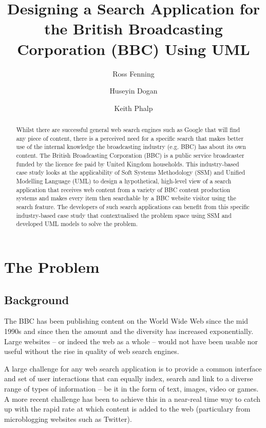 \documentclass{llncs}
\title{Designing a Search Application for the British Broadcasting Corporation (BBC) Using UML}
\author{Ross Fenning\inst{1}
  \and Huseyin Dogan\inst{2}
  \and Keith Phalp\inst{2}}
\institute{BBC, UK \email{Ross.Fenning@bbc.co.uk}
  \and Bournemouth University, UK \email{\{hdogan,kphalp\}@bournemouth.ac.uk}}
\begin{document}
\maketitle

\begin{abstract}

Whilst there are successful general web search engines such as Google that
will find any piece of content, there is a perceived need for a specific
search that makes better use of the internal knowledge the broadcasting
industry (e.g. BBC) has about its own content. The British Broadcasting
Corporation (BBC) is a public service broadcaster funded by the licence
fee paid by United Kingdom households. This industry-based case study
looks at the applicability of Soft Systems Methodology (SSM) and
Unified Modelling Language (UML) to design a hypothetical, high-level
view of a search application that receives
web content from a variety of BBC content production systems and makes
every item then searchable by a BBC website visitor using the search
feature. The developers of such search applications can benefit from this
specific industry-based case study that contextualised the problem space
using SSM and developed UML models to solve the problem.

\end{abstract}

\section{The Problem}

\subsection{Background}

The BBC has been publishing content on the World Wide Web since the
mid 1990s and since then the amount and the diversity has increased
exponentially. Large websites -- or indeed the web as a whole --
would not have been usable nor useful without the rise in quality of
web search engines.

A large challenge for any web search application is to provide a common
interface and set of user interactions that can equally index, search
and link to a diverse range of types of information -- be it in the form
of text, images, video or games. A more recent challenge has been to
achieve this in a near-real time way to catch up with the rapid rate at
which content is added to the web (particulary from microblogging websites
such as Twitter).
\end{document}
